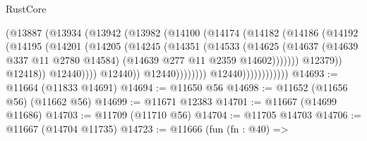 \begin{lexlean}{RustCore}
\begin{coremodule}
                                          (@13887
                                            (@13934
                                              (@13942
                                                (@13982
                                                  (@14100
                                                    (@14174
                                                      (@14182
                                                        (@14186
                                                          (@14192
                                                            (@14195
                                                              (@14201
                                                                (@14205
                                                                  (@14245
                                                                    (@14351
                                                                      (@14533
                                                                        (@14625
                                                                          (@14637
                                                                            (@14639
                                                                              @337
                                                                              @11
                                                                              @2780
                                                                              @14584)
                                                                            (@14639
                                                                              @277
                                                                              @11
                                                                              @2359
                                                                              @14602)))))))
                                                                @12379))
                                                            @12418))
                                                        @12440))))
                                                @12440))
                                            @12440))))))))
                            @12440))))))))))))
@14693 := @11664 (@11833 @14691)
@14694 := @11650 @56
@14698 := @11652 (@11656 @56) (@11662 @56)
@14699 := @11671 @12383
@14701 := @11667 (@14699 @11686)
@14703 := @11709 (@11710 @56)
@14704 := @11705 @14703
@14706 := @11667 (@14704 @11735)
@14723 := @11666
    (fun (fn : @40) =>

\end{coremodule}
\end{lexlean}
